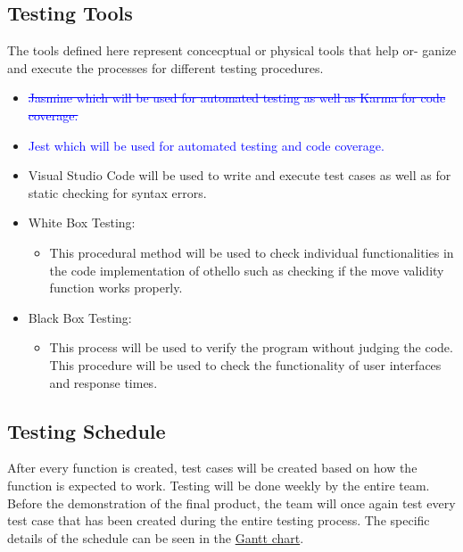 \documentclass[12pt, titlepage]{article}
\begin{document}
\subsection{Testing Tools}
The tools defined here represent concecptual or physical tools that help or- ganize and execute the processes for different testing procedures.
\begin{itemize}

	\item \textcolor{blue}{\sout{Jasmine which will be used for automated testing as well as Karma for code coverage.}}
	\item \textcolor{blue}{Jest which will be used for automated testing and code coverage.}
	
	\item Visual Studio Code will be used to write and execute test cases as well as for static checking for syntax errors.

	\item White Box Testing:
	      \begin{itemize}
		      \item This procedural method will be used to check individual functionalities in the code implementation of othello such as checking if the move validity function works properly.
	      \end{itemize}

	\item Black Box Testing:
	      \begin{itemize}
		      \item  This process will be used to verify the program without judging the code. This procedure will be used to check the functionality of user interfaces and response times.
	      \end{itemize}

\end{itemize}

\subsection{Testing Schedule}
After every function is created, test cases will be created based on how the function is expected to work. Testing will be done weekly by the entire team. Before the demonstration of the final product, the team will once again test every test case that has been created during the entire testing process. The specific details of the schedule can be seen in the \href{https://gitlab.cas.mcmaster.ca/patelj60/3XA3-G02-Othello/blob/master/ProjectSchedule/3XA3_Project_Plan.pdf}{Gantt chart}.
\end{document}

